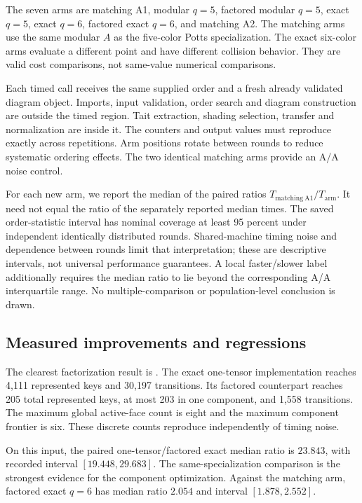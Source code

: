 The seven arms are matching A1, modular $q=5$, factored modular $q=5$,
exact $q=5$, exact $q=6$, factored exact $q=6$, and matching A2.
The matching arms use the same modular $A$ as the five-color Potts
specialization. The exact six-color arms evaluate a different point and
have different collision behavior. They are valid cost comparisons, not
same-value numerical comparisons.

Each timed call receives the same supplied order and a fresh already
validated diagram object. Imports, input validation, order search and
diagram construction are outside the timed region. Tait extraction,
shading selection, transfer and normalization are inside it.
The counters and output values must reproduce exactly across repetitions.
Arm positions rotate between rounds to reduce systematic ordering effects.
The two identical matching arms provide an A/A noise control.

For each new arm, we report the median of the paired ratios
$T_{\mathrm{matching\ A1}}/T_{\mathrm{arm}}$. It need not equal the ratio
of the separately reported median times.
The saved order-statistic interval has nominal coverage at least 95 percent
under independent identically distributed rounds. Shared-machine timing
noise and dependence between rounds limit that interpretation; these are
descriptive intervals, not universal performance guarantees.
A local faster/slower label additionally requires the median ratio to lie
beyond the corresponding A/A interquartile range.
No multiple-comparison or population-level conclusion is drawn.

\subsection{Measured improvements and regressions}



The clearest factorization result is .
The exact one-tensor implementation reaches 4,111 represented keys and
30,197 transitions. Its factored counterpart reaches 205 total represented
keys, at most 203 in one component, and 1,558 transitions.
The maximum global active-face count is eight and the maximum
component frontier is six. These discrete counts reproduce independently
of timing noise.

On this input, the paired one-tensor/factored exact median ratio is
$23.843$, with recorded interval $[19.448,29.683]$.
The same-specialization comparison is the strongest evidence for the
component optimization. Against the matching arm, factored exact $q=6$
has median ratio $2.054$ and interval $[1.878,2.552]$.

